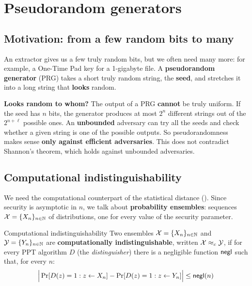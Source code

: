 
\section{Pseudorandom generators}

\subsection{Motivation: from a few random bits to many}

An extractor gives us a few truly random bits, but we often need many more: for example, a One-Time Pad key for a 1-gigabyte file. A \textbf{pseudorandom generator} (PRG) takes a short truly random string, the \textbf{seed}, and stretches it into a long string that \textbf{looks} random.

\textbf{Looks random to whom?} The output of a PRG \textbf{cannot} be truly uniform. If the seed has $n$ bits, the generator produces at most $2^n$ different strings out of the $2^{n+\ell}$ possible ones. An \textbf{unbounded} adversary can try all the seeds and check whether a given string is one of the possible outputs. So pseudorandomness makes sense \textbf{only against efficient adversaries}. This does not contradict Shannon's theorem, which holds against unbounded adversaries.

\subsection{Computational indistinguishability}

We need the computational counterpart of the statistical distance (). Since security is asymptotic in $n$, we talk about \textbf{probability ensembles}: sequences $\mathcal{X} = \{X_n\}_{n \in \mathbb{N}}$ of distributions, one for every value of the security parameter.

\begin{frameddefn}[label={def:cind}]{Computational indistinguishability}
  Two ensembles $\mathcal{X} = \{X_n\}_{n \in \mathbb{N}}$ and $\mathcal{Y} = \{Y_n\}_{n \in \mathbb{N}}$ are \textbf{computationally indistinguishable}, written $\mathcal{X} \approx_c \mathcal{Y}$, if for every PPT algorithm $D$ (the \textit{distinguisher}) there is a negligible function $\mathsf{negl}$ such that, for every $n$:
  \[
    \Big|\Pr[D(z) = 1 : z \leftarrow X_n] - \Pr[D(z) = 1 : z \leftarrow Y_n]\Big| \leq \mathsf{negl}(n)
  \]
\end{frameddefn}

